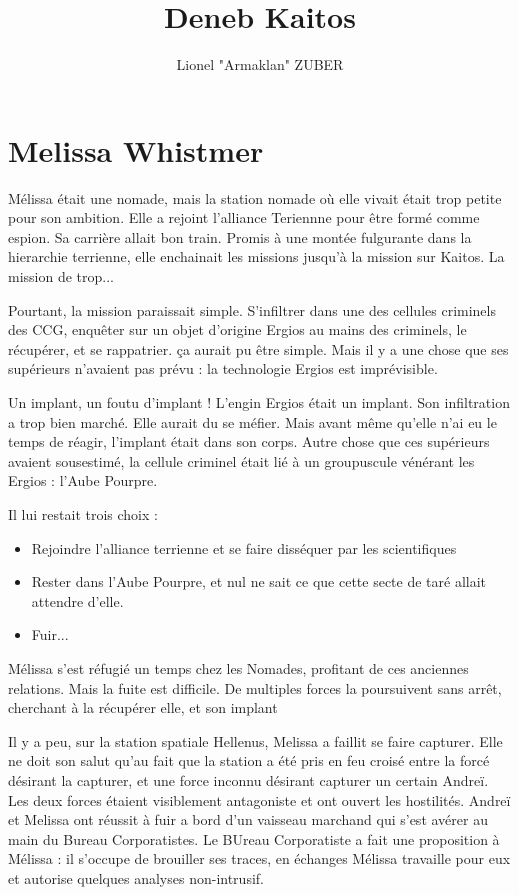 \documentclass{DenebClass}
\title{Deneb Kaitos}
\author{Lionel "Armaklan" ZUBER}
\begin{document}
\chapter*{Melissa Whistmer}

Mélissa était une nomade, mais la station nomade où elle vivait était trop petite pour son ambition. Elle a rejoint l'alliance Teriennne pour être formé comme espion. Sa carrière allait bon train. Promis à une montée fulgurante dans la hierarchie terrienne, elle enchainait les missions jusqu'à la mission sur Kaitos. La mission de trop...

Pourtant, la mission paraissait simple. S'infiltrer dans une des cellules criminels des CCG, enquêter sur un objet d'origine Ergios au mains des criminels, le récupérer, et se rappatrier. ça aurait pu être simple. Mais il y a une chose que ses supérieurs n'avaient pas prévu : la technologie Ergios est imprévisible.

Un implant, un foutu d'implant ! L'engin Ergios était un implant. Son infiltration a trop bien marché. Elle aurait du se méfier. Mais avant même qu'elle n'ai eu le temps de réagir, l'implant était dans son corps. Autre chose que ces supérieurs avaient sousestimé, la cellule criminel était lié à un groupuscule vénérant les Ergios : l'Aube Pourpre.

Il lui restait trois choix :
\begin{itemize}
\item Rejoindre l'alliance terrienne et se faire disséquer par les scientifiques
\item Rester dans l'Aube Pourpre, et nul ne sait ce que cette secte de taré allait attendre d'elle.
\item Fuir...
\end{itemize}

Mélissa s'est réfugié un temps chez les Nomades, profitant de ces anciennes relations. Mais la fuite est difficile. De multiples forces la poursuivent sans arrêt, cherchant à la récupérer elle, et son implant

Il y a peu, sur la station spatiale Hellenus, Melissa a faillit se faire capturer. Elle ne doit son salut qu'au fait que la station a été pris en feu croisé entre la forcé désirant la capturer, et une force inconnu désirant capturer un certain Andreï. Les deux forces étaient visiblement antagoniste et ont ouvert les hostilités. Andreï et Melissa ont réussit à fuir a bord d'un vaisseau marchand qui s'est avérer au main du Bureau Corporatistes. Le BUreau Corporatiste a fait une proposition à Mélissa : il s'occupe de brouiller ses traces, en échanges Mélissa travaille pour eux et autorise quelques analyses non-intrusif. 
\end{document}
